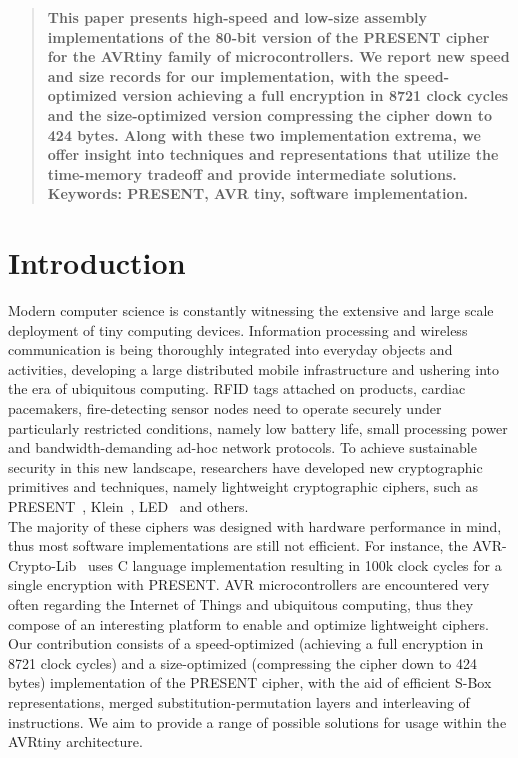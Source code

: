 \documentclass[11pt]{article}
\begin{document}
\author{}
\date{}
\maketitle

\begin{abstract}
\textbf{This paper presents high-speed and low-size assembly implementations of the 80-bit version of the PRESENT cipher for the AVRtiny family of microcontrollers. We report new speed and size records for our implementation, with the speed-optimized version achieving a full encryption in 8721 clock cycles and the size-optimized version compressing the cipher down to 424 bytes. Along with these two implementation extrema, we offer insight into techniques and representations that utilize the time-memory tradeoff and provide intermediate solutions.\\Keywords: PRESENT, AVR tiny, software implementation.}
\end{abstract}
\section{Introduction}
Modern computer science is constantly witnessing the extensive and large scale deployment of tiny computing devices. Information processing and wireless communication is being thoroughly integrated into everyday objects and activities, developing a large distributed mobile infrastructure and ushering into the era of ubiquitous computing. RFID tags attached on products, cardiac pacemakers, fire-detecting sensor nodes need to operate securely under particularly restricted conditions, namely low battery life, small processing power and bandwidth-demanding ad-hoc network protocols. To achieve sustainable security in this new landscape, researchers have developed new cryptographic primitives and techniques, namely lightweight cryptographic ciphers, such as PRESENT~\cite{bogdanov2007present}, Klein~\cite{klein}, LED~\cite{led} and others.\\
The majority of these ciphers was designed with hardware performance in mind, thus most software implementations are still not efficient. For instance, the AVR-Crypto-Lib~\cite{cryptolib} uses C language implementation resulting in 100k clock cycles for a single encryption with PRESENT. AVR microcontrollers are encountered very often regarding the Internet of Things and ubiquitous computing, thus they compose of an interesting platform to enable and optimize lightweight ciphers. Our contribution consists of a speed-optimized (achieving  a full encryption in 8721 clock cycles) and a size-optimized (compressing the cipher down to 424 bytes)  implementation of the PRESENT cipher, with the aid of efficient S-Box representations, merged substitution-permutation layers and interleaving of instructions. We aim to provide a range of possible solutions for usage within the AVRtiny architecture.
\end{document}

